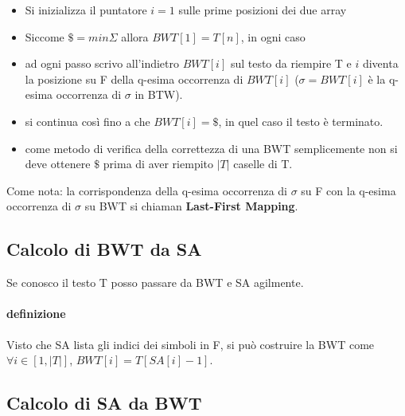\begin{itemize}
  \item Si inizializza il puntatore $i = 1$ sulle prime posizioni dei due array
  \item Siccome $\$ = min \Sigma$ allora $BWT[1] = T[n]$, in ogni caso
  \item ad ogni passo scrivo all'indietro $BWT[i]$ sul testo da riempire T e $i$ diventa la posizione su F della q-esima occorrenza di $BWT[i]$ ($\sigma = BWT[i]$ \`e la q-esima occorrenza di $\sigma$ in BTW).
  \item si continua cos\`i fino a che $BWT[i] = \$$, in quel caso il testo \`e terminato.
  \item come metodo di verifica della correttezza di una BWT semplicemente non si deve ottenere $\$$ prima di aver riempito $|T|$ caselle di T.
\end{itemize}

Come nota: la corrispondenza della q-esima occorrenza di $\sigma$ su F con la q-esima occorrenza di $\sigma$ su BWT si chiaman \textbf{Last-First Mapping}.

\subsection{Calcolo di BWT da SA}

Se conosco il testo T posso passare da BWT e SA agilmente.

\paragraph{definizione} Visto che SA lista gli indici dei simboli in F, si pu\`o costruire la BWT come $\forall i \in [1, |T|]$, $BWT[i] = T[SA[i] - 1]$.

\subsection{Calcolo di SA da BWT}
